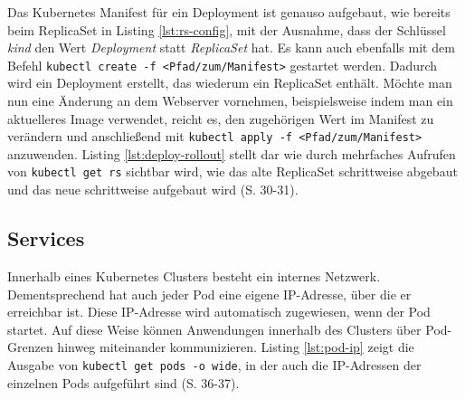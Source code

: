 \documentclass[11pt,a4paper]{article}
\begin{document}
Das Kubernetes Manifest für ein Deployment ist genauso aufgebaut, wie bereits beim ReplicaSet in
Listing \ref{lst:rs-config}, mit der Ausnahme, dass der Schlüssel \emph{kind} den Wert
\emph{Deployment} statt \emph{ReplicaSet} hat. Es kann auch ebenfalls mit dem Befehl
\lstinline|kubectl create -f <Pfad/zum/Manifest>| gestartet werden.
Dadurch wird ein Deployment erstellt, das wiederum ein ReplicaSet enthält.
Möchte man nun eine Änderung an dem Webserver vornehmen, beispielsweise indem
man ein aktuelleres Image verwendet, reicht es, den zugehörigen Wert im Manifest
zu verändern und anschließend mit \lstinline|kubectl apply -f <Pfad/zum/Manifest>| anzuwenden.
Listing \ref{lst:deploy-rollout} stellt dar wie durch mehrfaches Aufrufen
von \lstinline|kubectl get rs| sichtbar wird, wie das alte
ReplicaSet schrittweise abgebaut und das neue schrittweise aufgebaut wird \cite{Schmeling_Dargatz_2022} (S. 30-31).




\subsection{Services}
Innerhalb eines Kubernetes Clusters besteht ein internes Netzwerk. Dementsprechend hat auch jeder Pod
eine eigene IP-Adresse, über die er erreichbar ist. Diese IP-Adresse wird automatisch zugewiesen, wenn der Pod startet.
Auf diese Weise können Anwendungen innerhalb des Clusters über Pod-Grenzen hinweg miteinander kommunizieren.
Listing \ref{lst:pod-ip} zeigt die Ausgabe von \lstinline|kubectl get pods -o wide|, in der auch die IP-Adressen
der einzelnen Pods aufgeführt sind \cite{Schmeling_Dargatz_2022} (S. 36-37).
\end{document}
